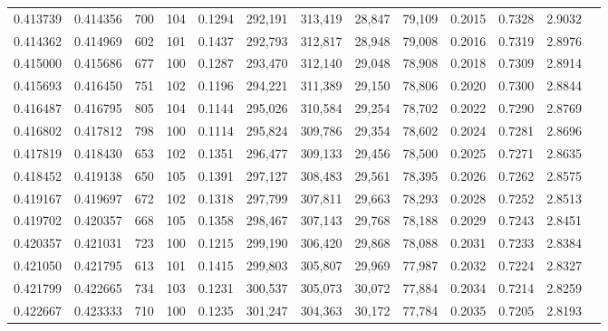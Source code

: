 \begin{tabular}{rrrrrrrrrrrrr}
0.413739 & 0.414356 &    700 &   104 &                                     0.1294 & 292,191 & 313,419 &  28,847 &  79,109 & 0.2015 & 0.7328 & 2.9032 \\
0.414362 & 0.414969 &    602 &   101 &                                     0.1437 & 292,793 & 312,817 &  28,948 &  79,008 & 0.2016 & 0.7319 & 2.8976 \\
0.415000 & 0.415686 &    677 &   100 &                                     0.1287 & 293,470 & 312,140 &  29,048 &  78,908 & 0.2018 & 0.7309 & 2.8914 \\
0.415693 & 0.416450 &    751 &   102 &                                     0.1196 & 294,221 & 311,389 &  29,150 &  78,806 & 0.2020 & 0.7300 & 2.8844 \\
0.416487 & 0.416795 &    805 &   104 &                                     0.1144 & 295,026 & 310,584 &  29,254 &  78,702 & 0.2022 & 0.7290 & 2.8769 \\
0.416802 & 0.417812 &    798 &   100 &                                     0.1114 & 295,824 & 309,786 &  29,354 &  78,602 & 0.2024 & 0.7281 & 2.8696 \\
0.417819 & 0.418430 &    653 &   102 &                                     0.1351 & 296,477 & 309,133 &  29,456 &  78,500 & 0.2025 & 0.7271 & 2.8635 \\
0.418452 & 0.419138 &    650 &   105 &                                     0.1391 & 297,127 & 308,483 &  29,561 &  78,395 & 0.2026 & 0.7262 & 2.8575 \\
0.419167 & 0.419697 &    672 &   102 &                                     0.1318 & 297,799 & 307,811 &  29,663 &  78,293 & 0.2028 & 0.7252 & 2.8513 \\
0.419702 & 0.420357 &    668 &   105 &                                     0.1358 & 298,467 & 307,143 &  29,768 &  78,188 & 0.2029 & 0.7243 & 2.8451 \\
0.420357 & 0.421031 &    723 &   100 &                                     0.1215 & 299,190 & 306,420 &  29,868 &  78,088 & 0.2031 & 0.7233 & 2.8384 \\
0.421050 & 0.421795 &    613 &   101 &                                     0.1415 & 299,803 & 305,807 &  29,969 &  77,987 & 0.2032 & 0.7224 & 2.8327 \\
0.421799 & 0.422665 &    734 &   103 &                                     0.1231 & 300,537 & 305,073 &  30,072 &  77,884 & 0.2034 & 0.7214 & 2.8259 \\
0.422667 & 0.423333 &    710 &   100 &                                     0.1235 & 301,247 & 304,363 &  30,172 &  77,784 & 0.2035 & 0.7205 & 2.8193 \\

\end{tabular}
